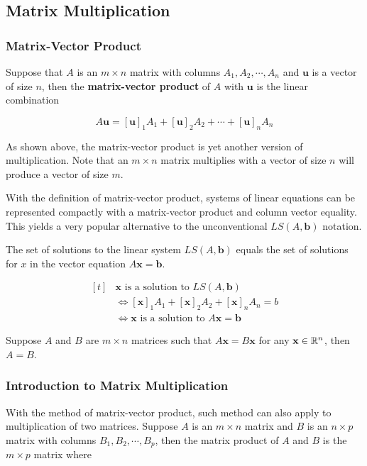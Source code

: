 \documentclass[a4paper,12pt]{article}
\begin{document}
\subsection{Matrix Multiplication}
\subsubsection{Matrix-Vector Product}
\begin{dft}
  Suppose that $A$ is an $m\times n$ matrix with columns $A_{1},A_{2},\cdots,A_{n}$ and $\mathbf{u}$ is a vector of size $n$, then the \textbf{matrix-vector product} of $A$ with $\textbf{u}$ is the linear combination

  $$A\mathbf{u}=[\mathbf{u}]_{1}A_{1}+[\mathbf{u}]_{2}A_{2}+\cdots+[\mathbf{u}]_{n}A_{n}$$
\end{dft}\n

As shown above, the matrix-vector product is yet another version of multiplication. Note that an $m\times n$ matrix multiplies with a vector of size $n$ will produce a vector of size $m$.\n

With the definition of matrix-vector product, systems of linear equations can be represented compactly with a matrix-vector product and column vector equality. This yields a very popular alternative to the unconventional $LS(A,\mathbf{b})$ notation.\n

\begin{pst}
  The set of solutions to the linear system $LS(A,\mathbf{b})$ equals the set of solutions for $x$ in the vector equation $A\mathbf{x}=\mathbf{b}$.\n

  \prf $$\begin{aligned}[t]
    &\mathbf{x}\text{ is a solution to }LS(A,\mathbf{b})\\
    &\Leftrightarrow[\mathbf{x}]_{1}A_{1}+[\mathbf{x}]_{2}A_{2}+[\mathbf{x}]_{n}A_{n}=b\\
    &\Leftrightarrow\mathbf{x}\text{ is a solution to }A\mathbf{x}=\mathbf{b}
  \end{aligned}$$
\end{pst}\n

\begin{pst}
  Suppose $A$ and $B$ are $m\times n$ matrices such that $A\mathbf{x}=B\mathbf{x}$ for any $\mathbf{x}\in\mathbb{R}^{n}$, then $A=B$.
\end{pst}\n

\subsubsection{Introduction to Matrix Multiplication}
With the method of matrix-vector product, such method can also apply to multiplication of two matrices. Suppose $A$ is an $m\times n$ matrix and $B$ is an $n\times p$ matrix with columns $B_{1},B_{2},\cdots,B_{p}$, then the matrix product of $A$ and $B$ is the $m\times p$ matrix where
\end{document}

